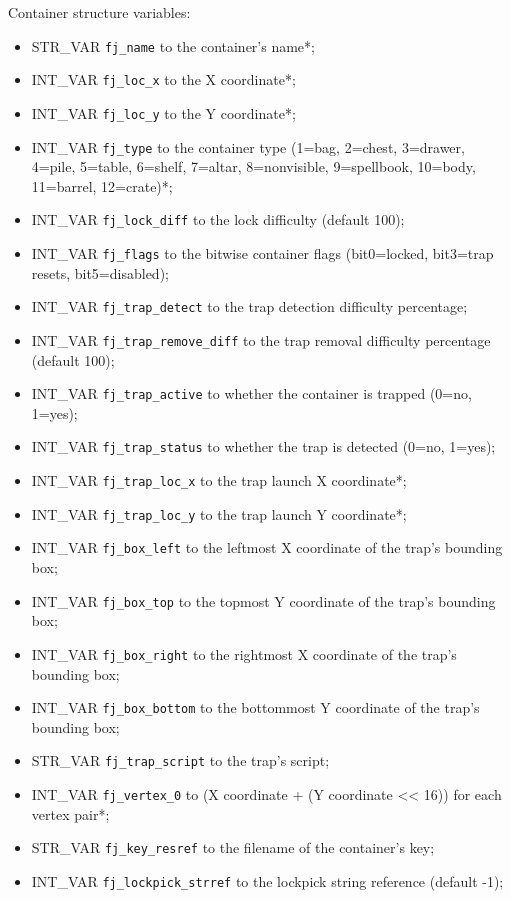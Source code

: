 \documentclass{article}
\begin{document}
Container structure variables:
\begin{itemize}
\item STR_VAR \verb+fj_name+ to the container's name*;
\item INT_VAR \verb+fj_loc_x+ to the X coordinate*;
\item INT_VAR \verb+fj_loc_y+ to the Y coordinate*;
\item INT_VAR \verb+fj_type+ to the container type (1=bag, 2=chest, 3=drawer, 4=pile, 5=table, 6=shelf, 7=altar, 8=nonvisible, 9=spellbook, 10=body, 11=barrel, 12=crate)*;
\item INT_VAR \verb+fj_lock_diff+ to the lock difficulty (default 100);
\item INT_VAR \verb+fj_flags+ to the bitwise container flags (bit0=locked, bit3=trap resets, bit5=disabled);
\item INT_VAR \verb+fj_trap_detect+ to the trap detection difficulty percentage;
\item INT_VAR \verb+fj_trap_remove_diff+ to the trap removal difficulty percentage (default 100);
\item INT_VAR \verb+fj_trap_active+ to whether the container is trapped (0=no, 1=yes);
\item INT_VAR \verb+fj_trap_status+ to whether the trap is detected (0=no, 1=yes);
\item INT_VAR \verb+fj_trap_loc_x+ to the trap launch X coordinate*;
\item INT_VAR \verb+fj_trap_loc_y+ to the trap launch Y coordinate*;
\item INT_VAR \verb+fj_box_left+ to the leftmost X coordinate of the trap's bounding box;
\item INT_VAR \verb+fj_box_top+ to the topmost Y coordinate of the trap's bounding box;
\item INT_VAR \verb+fj_box_right+ to the rightmost X coordinate of the trap's bounding box;
\item INT_VAR \verb+fj_box_bottom+ to the bottommost Y coordinate of the trap's bounding box;
\item STR_VAR \verb+fj_trap_script+ to the trap's script;
\item INT_VAR \verb+fj_vertex_0+ to (X coordinate + (Y coordinate << 16)) for each vertex pair*;
\item STR_VAR \verb+fj_key_resref+ to the filename of the container's key;
\item INT_VAR \verb+fj_lockpick_strref+ to the lockpick string reference (default -1);
\end{itemize}
\end{document}
